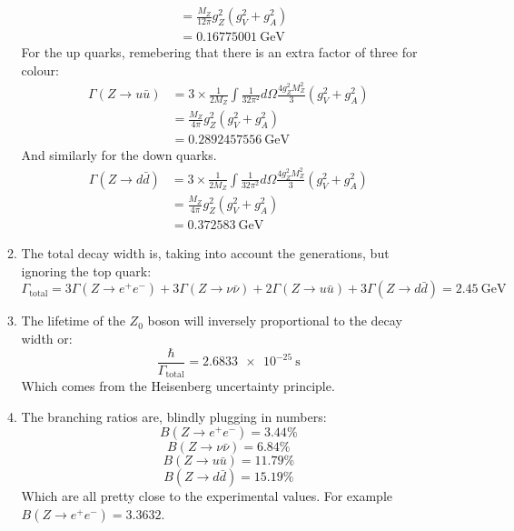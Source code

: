 \documentclass[12pt,a4]{article}
\begin{document}
\begin{enumerate}
\begin{enumerate}
\begin{align*}
                                &= \frac{M_Z}{12 \pi } g_Z^2 (g_V^2 + g_A^2) \\
                                &= \SI{0.16775001}{\giga \eV}
        \end{align*}
        For the up quarks, remebering that there is an extra factor of three for colour:
        \begin{align*}
          \Gamma(Z \to u \bar{u}) 
                                &= 3 \times \frac{1}{2 M_Z}\int \frac{1}{32 \pi^2} d\Omega \frac{4 g_Z^2 M_Z^2}{3} (g_V^2 + g_A^2) \\
                                &= \frac{M_Z}{4 \pi } g_Z^2 (g_V^2 + g_A^2) \\
                                &= \SI{0.2892457556}{\giga \eV}
        \end{align*}
        And similarly for the down quarks.
        \begin{align*}
          \Gamma(Z \to d \bar{d}) 
                                &= 3 \times \frac{1}{2 M_Z}\int \frac{1}{32 \pi^2} d\Omega \frac{4 g_Z^2 M_Z^2}{3} (g_V^2 + g_A^2) \\
                                &= \frac{M_Z}{4 \pi } g_Z^2 (g_V^2 + g_A^2) \\
                                &= \SI{0.372583}{\giga \eV}
        \end{align*}
      \item
        The total decay width is, taking into account the generations, but ignoring the top quark:
        \begin{equation*}
          \Gamma_\text{total} = 3 \Gamma(Z \to e^+ e^-) + 3 \Gamma(Z \to \nu \bar{\nu}) + 2 \Gamma(Z \to u \bar{u}) +  3 \Gamma(Z \to d \bar{d}) = \SI{2.45}{\giga \eV}
        \end{equation*}
      \item
        The lifetime of the $Z_0$ boson will inversely proportional to the decay width or:
        \begin{equation*}
          \frac{\hbar}{\Gamma_{\text{total}}} = \SI{2.6833e-25}{\second}
        \end{equation*}
        Which comes from the Heisenberg uncertainty principle.
      \item
        The branching ratios are, blindly plugging in numbers:
        \begin{equation*}
          B(Z \to e^+ e^-) = 3.44 \%
        \end{equation*}
        \begin{equation*}
          B(Z \to \nu \bar{\nu}) = 6.84 \%
        \end{equation*}
        \begin{equation*}
          B(Z \to u \bar{u}) = 11.79 \%
        \end{equation*}
        \begin{equation*}
          B(Z \to d \bar{d}) =  15.19\%
        \end{equation*}
        Which are all pretty close to the experimental values.
        For example $B(Z \to e^+ e^-) = 3.3632$.
    \end{enumerate}
\end{enumerate}
\end{document}
